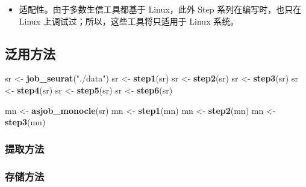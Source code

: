 \documentclass[
]{article}
\newenvironment{Shaded}{\begin{snugshade}}{\end{snugshade}}
\newcommand{\KeywordTok}[1]{\textcolor[rgb]{0.13,0.29,0.53}{\textbf{#1}}}
\newcommand{\NormalTok}[1]{#1}
\newcommand{\OperatorTok}[1]{\textcolor[rgb]{0.81,0.36,0.00}{\textbf{#1}}}
\newcommand{\StringTok}[1]{\textcolor[rgb]{0.31,0.60,0.02}{#1}}
\providecommand{\tightlist}{%
  \setlength{\itemsep}{0pt}\setlength{\parskip}{0pt}}
\begin{document}
\begin{itemize}
\tightlist
\item
  适配性。由于多数生信工具都基于 Linux，此外 Step 系列在编写时，也只在 Linux 上调试过；所以，这些工具将只适用于 Linux 系统。
\end{itemize}

\hypertarget{ux6cdbux7528ux65b9ux6cd5}{%
\subsection{泛用方法}\label{ux6cdbux7528ux65b9ux6cd5}}

\begin{Shaded}
\begin{Highlighting}[]
\NormalTok{sr \textless{}{-}}\StringTok{ }\KeywordTok{job\_seurat}\NormalTok{(}\StringTok{"./data"}\NormalTok{)}
\NormalTok{sr \textless{}{-}}\StringTok{ }\KeywordTok{step1}\NormalTok{(sr)}
\NormalTok{sr \textless{}{-}}\StringTok{ }\KeywordTok{step2}\NormalTok{(sr)}
\NormalTok{sr \textless{}{-}}\StringTok{ }\KeywordTok{step3}\NormalTok{(sr)}
\NormalTok{sr \textless{}{-}}\StringTok{ }\KeywordTok{step4}\NormalTok{(sr)}
\NormalTok{sr \textless{}{-}}\StringTok{ }\KeywordTok{step5}\NormalTok{(sr)}
\NormalTok{sr \textless{}{-}}\StringTok{ }\KeywordTok{step6}\NormalTok{(sr)}

\NormalTok{mn \textless{}{-}}\StringTok{ }\KeywordTok{asjob\_monocle}\NormalTok{(sr)}
\NormalTok{mn \textless{}{-}}\StringTok{ }\KeywordTok{step1}\NormalTok{(mn)}
\NormalTok{mn \textless{}{-}}\StringTok{ }\KeywordTok{step2}\NormalTok{(mn)}
\NormalTok{mn \textless{}{-}}\StringTok{ }\KeywordTok{step3}\NormalTok{(mn)}
\end{Highlighting}
\end{Shaded}

\hypertarget{ux63d0ux53d6ux65b9ux6cd5}{%
\subsubsection{提取方法}\label{ux63d0ux53d6ux65b9ux6cd5}}

\hypertarget{ux5b58ux50a8ux65b9ux6cd5}{%
\subsubsection{存储方法}\label{ux5b58ux50a8ux65b9ux6cd5}}

\begin{Shaded}
\end{Shaded}
\end{document}
